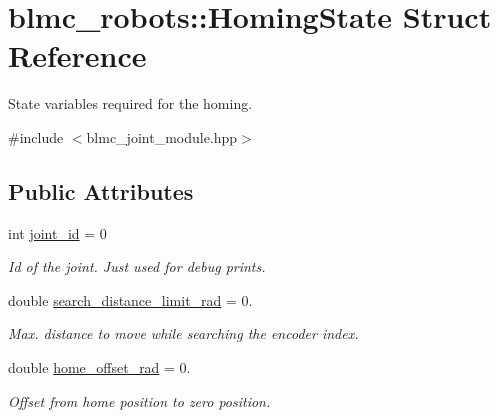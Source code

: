 \hypertarget{structblmc__robots_1_1HomingState}{}\section{blmc\+\_\+robots\+:\+:Homing\+State Struct Reference}
\label{structblmc__robots_1_1HomingState}


State variables required for the homing.  




{\ttfamily \#include $<$blmc\+\_\+joint\+\_\+module.\+hpp$>$}

\subsection*{Public Attributes}
\begin{DoxyCompactItemize}
\item 
\mbox{\label{structblmc__robots_1_1HomingState_a61557c9cbddb3183ccccafc456a1a00f}} 
int \hyperlink{structblmc__robots_1_1HomingState_a61557c9cbddb3183ccccafc456a1a00f}{joint\+\_\+id} = 0
\begin{DoxyCompactList}\small\item\em Id of the joint. Just used for debug prints. \end{DoxyCompactList}\item 
\mbox{\label{structblmc__robots_1_1HomingState_a3ce572a7b025bbdf1eaaa5b72dc11dde}} 
double \hyperlink{structblmc__robots_1_1HomingState_a3ce572a7b025bbdf1eaaa5b72dc11dde}{search\+\_\+distance\+\_\+limit\+\_\+rad} = 0.
\begin{DoxyCompactList}\small\item\em Max. distance to move while searching the encoder index. \end{DoxyCompactList}\item 
\mbox{\label{structblmc__robots_1_1HomingState_ad8ffa51d7885e6e83dd4b32354184175}} 
double \hyperlink{structblmc__robots_1_1HomingState_ad8ffa51d7885e6e83dd4b32354184175}{home\+\_\+offset\+\_\+rad} = 0.
\begin{DoxyCompactList}\small\item\em Offset from home position to zero position. \end{DoxyCompactList}\item 

\end{DoxyCompactItemize}
